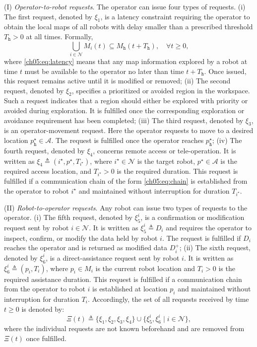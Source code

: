 (I) \emph{Operator-to-robot requests}.
The operator can issue four types of requests.
(i) The first request, denoted by $\xi_1$, is a latency constraint requiring the
operator to obtain the local maps of all robots with delay smaller than a
prescribed threshold $T_{\texttt{h}} > 0$ at all times. Formally,
\begin{equation}
\bigcup_{i \in \mathcal{N}} M_i(t)
\subseteq M_{\texttt{h}}(t + T_{\texttt{h}}),
\quad \forall t \geq 0,
\label{ch05:eq:latency}
\end{equation}
where \eqref{ch05:eq:latency} means that any map information explored by a
robot at time $t$ must be available to the operator no later than time
$t + T_{\texttt{h}}$. Once issued, this request remains active until it is
modified or removed;
(ii) The second request, denoted by $\xi_2$, specifies a prioritized or avoided
region in the workspace. Such a request indicates that a region should either be
explored with priority or avoided during exploration. It is fulfilled once the
corresponding exploration or avoidance requirement has been completed;
(iii) The third request, denoted by $\xi_3$, is an operator-movement request. Here the
operator requests to move to a desired location
$p_{\texttt{h}}^\star \in \mathcal{A}$. The request is fulfilled once the
operator reaches $p_{\texttt{h}}^\star$;
(iv) The fourth request, denoted by $\xi_4$, concerns remote access or
tele-operation. It is written as
$\xi_4 \triangleq (i^\star, p^\star, T_{i^\star})$, where
$i^\star \in \mathcal{N}$ is the target robot, $p^\star \in \mathcal{A}$ is the
required access location, and $T_{i^\star} > 0$ is the required duration. This
request is fulfilled if a communication chain of the form
\eqref{ch05:eq:chain} is established from the operator to robot $i^\star$ and
maintained without interruption for duration $T_{i^\star}$.

(II) \emph{Robot-to-operator requests}.
Any robot can issue two types of requests to the operator.
(i) The fifth request, denoted by $\xi_5^i$, is a confirmation or modification
request sent by robot $i \in \mathcal{N}$. It is written as
$\xi_5^i \triangleq D_i$ and requires the operator to inspect, confirm, or
modify the data held by robot $i$. The request is fulfilled if $D_i$ reaches
the operator and is returned as modified data $D_i^+$;
(ii) The sixth request, denoted by $\xi_6^i$, is a direct-assistance request sent by
robot $i$. It is written as $\xi_6^i \triangleq (p_i, T_i)$, where
$p_i \in M_i$ is the current robot location and $T_i > 0$ is the required
assistance duration. This request is fulfilled if a communication chain from the
operator to robot $i$ is established at location $p_i$ and maintained without
interruption for duration $T_i$.
Accordingly, the set of all requests received by time $t \geq 0$ is denoted by:
\begin{equation}
\Xi(t) \triangleq
\Big\{\xi_1, \xi_2, \xi_3, \xi_4\Big\}
\cup
\Big\{\xi_5^i, \xi_6^i \mid i \in \mathcal{N}\Big\},
\label{ch05:eq:requests}
\end{equation}
where the individual requests are not known beforehand and are removed from
$\Xi(t)$ once fulfilled.

